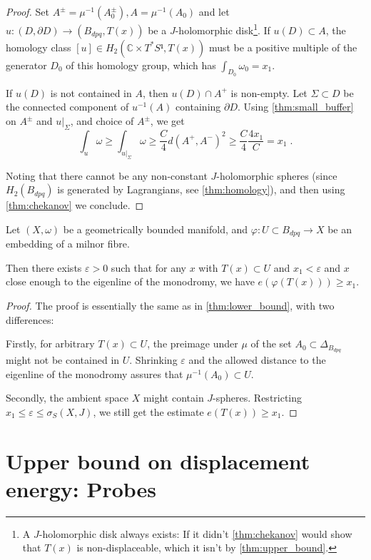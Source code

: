 \documentclass[12pt,a4paper,draft]{scrartcl}
\begin{document}
\begin{proof}
  Set $A^± = μ^{-1}(A_0^±), A = μ^{-1}(A_0)$ and let $u\colon (D,∂D) → (B_{dpq}, T(x))$ be a $J$-holomorphic disk\footnote{A $J$-holomorphic disk always exists: If it didn't \cref{thm:chekanov} would show that $T(x)$ is non-displaceable, which it isn't by \cref{thm:upper_bound}.}. If $u(D) ⊂ A$, the homology class $[u] ∈ H_2(ℂ × T^*S¹, T(x))$ must be a positive multiple of the generator $D_0$ of this homology group, which has $∫_{D_0} ω_0 = x_1$.
  
  If $u(D)$ is not contained in $A$, then $u(D) ∩ A^+$ is non-empty. Let $Σ ⊂ D$ be the connected component of $u^{-1}(A)$ containing $∂D$. Using \cref{thm:small_buffer} on $A^±$ and $u|_Σ$, and choice of $A^±$, we get
  \[∫_u ω ≥ ∫_{u|_Σ} ω ≥ \frac{C}{4} d(A^+,A^-)^2 ≥ \frac{C}{4} \frac{4x_1}{C} = x_1 \;. \]

  Noting that there cannot be any non-constant $J$-holomorphic spheres (since $H_2(B_{dpq})$ is generated by Lagrangians, see \cref{thm:homology}), and then using \cref{thm:chekanov} we conclude.
\end{proof}

\begin{proposition}
  \label{thm:embedded_lower_bound}
  Let $(X,ω)$ be a geometrically bounded manifold, and $φ \colon U ⊂ B_{dpq} → X$ be an embedding of a milnor fibre.

  Then there exists $ε>0$ such that for any $x$ with $T(x) ⊂ U$ and $x_1<ε$ and $x$ close enough to the eigenline of the monodromy, we have $e(φ(T(x))) ≥ x_1$.
\end{proposition}

\begin{proof}
  The proof is essentially the same as in \cref{thm:lower_bound}, with two differences:

  Firstly, for arbitrary $T(x) ⊂ U$, the preimage under $μ$ of the set $A_0 ⊂ Δ_{B_{dpq}}$ might not be contained in $U$.
  Shrinking $ε$ and the allowed distance to the eigenline of the monodromy assures that $μ^{-1}(A_0) ⊂ U$.

  Secondly, the ambient space $X$ might contain $J$-spheres. Restricting $x_1 ≤ ε ≤ σ_S(X,J)$, we still get the estimate $e(T(x)) ≥ x_1$.

\end{proof}

\section{Upper bound on displacement energy: Probes}
\label{sec:upper_bound}
\end{document}
